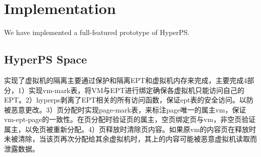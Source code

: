 \section{Implementation}%
\label{sec:implementation}
We have implemented a full-featured prototype of HyperPS.


\subsection{HyperPS Space}%
\label{sub:hyperps_space}
\iffalse 

实现了虚拟机的隔离主要通过保护和隔离EPT和虚拟机内存来完成，主要完成4部分，1）实现vm-mark表，将VM与EPT进行绑定确保各虚拟机只能访问自己的EPT。2）hyperps剥离了EPT相关的所有访问函数，保证ept表的安全访问。以防被恶意更改。3）页分配时实现page-mark表，来标注page唯一的属主vm，保证vm-ept-page的一致性。在页分配时验证页的属主，空页绑定页与vm，非空页验证属主，以免页被重新分配。4）页释放时清除页内容。如果原vm的内容页在释放时未被清除，当该页再次分配给其余虚拟机时，其上的内容可能被恶意虚拟机读取而泄露数据。

